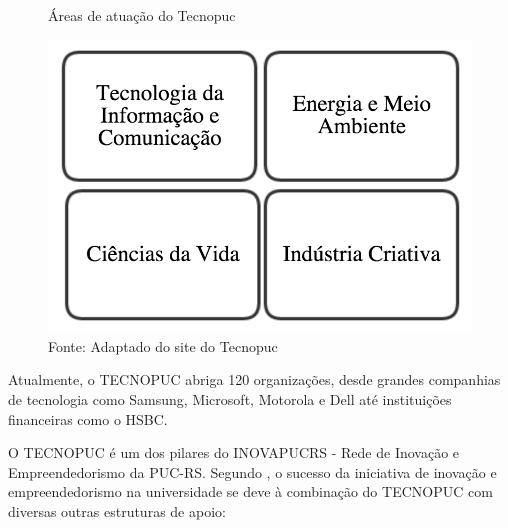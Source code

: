 \begin{figure}[H]
\caption{Áreas de atuação do Tecnopuc}
\centerline{\includegraphics[scale=0.5]{img/tecnopuc}}
\label{fig:tecnopuc}
\caption* {Fonte: Adaptado do site do Tecnopuc}
\end{figure}

Atualmente, o TECNOPUC abriga 120 organizações, desde grandes companhias de tecnologia como Samsung, Microsoft, Motorola e Dell até instituições financeiras como o HSBC. 

O TECNOPUC é um dos pilares do INOVAPUCRS - Rede de Inovação e Empreendedorismo da PUC-RS. Segundo , o sucesso da iniciativa de inovação e empreendedorismo na universidade se deve à combinação do TECNOPUC com diversas outras estruturas de apoio:

